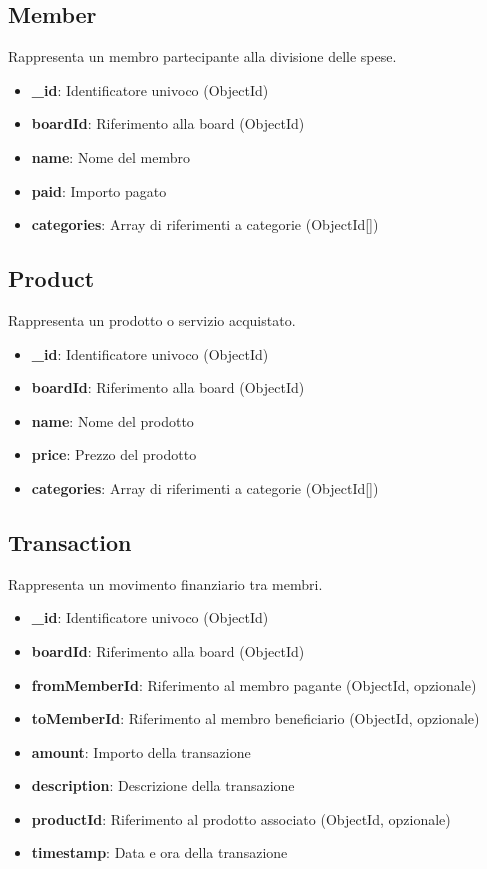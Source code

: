 \documentclass[11pt]{article}
\begin{document}
\subsection{Member}
Rappresenta un membro partecipante alla divisione delle spese.
\begin{itemize}
    \item \textbf{\_id}: Identificatore univoco (ObjectId)
    \item \textbf{boardId}: Riferimento alla board (ObjectId)
    \item \textbf{name}: Nome del membro
    \item \textbf{paid}: Importo pagato
    \item \textbf{categories}: Array di riferimenti a categorie (ObjectId[])
\end{itemize}

\subsection{Product}
Rappresenta un prodotto o servizio acquistato.
\begin{itemize}
    \item \textbf{\_id}: Identificatore univoco (ObjectId)
    \item \textbf{boardId}: Riferimento alla board (ObjectId)
    \item \textbf{name}: Nome del prodotto
    \item \textbf{price}: Prezzo del prodotto
    \item \textbf{categories}: Array di riferimenti a categorie (ObjectId[])
\end{itemize}

\subsection{Transaction}
Rappresenta un movimento finanziario tra membri.
\begin{itemize}
    \item \textbf{\_id}: Identificatore univoco (ObjectId)
    \item \textbf{boardId}: Riferimento alla board (ObjectId)
    \item \textbf{fromMemberId}: Riferimento al membro pagante (ObjectId, opzionale)
    \item \textbf{toMemberId}: Riferimento al membro beneficiario (ObjectId, opzionale)
    \item \textbf{amount}: Importo della transazione
    \item \textbf{description}: Descrizione della transazione
    \item \textbf{productId}: Riferimento al prodotto associato (ObjectId, opzionale)
    \item \textbf{timestamp}: Data e ora della transazione
\end{itemize}
\end{document}
